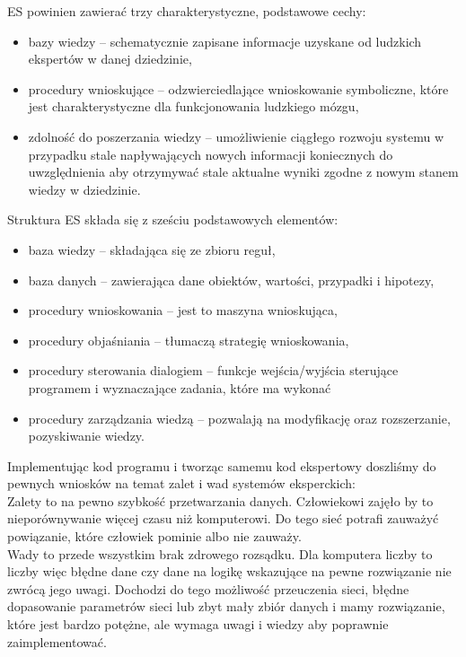 \documentclass[12pt,a4paper]{article}
\begin{document}
	ES powinien zawierać trzy charakterystyczne, podstawowe cechy:
	\begin{itemize}
		\item bazy wiedzy -- schematycznie zapisane informacje uzyskane od ludzkich ekspertów w danej dziedzinie,
		\item procedury wnioskujące -- odzwierciedlające wnioskowanie symboliczne, które jest charakterystyczne dla funkcjonowania ludzkiego mózgu,
		\item zdolność do poszerzania wiedzy -- umożliwienie ciągłego rozwoju systemu w przypadku stale napływających nowych informacji koniecznych do uwzględnienia aby otrzymywać stale aktualne wyniki zgodne z nowym stanem wiedzy w dziedzinie.
	\end{itemize}
	\bigskip
	
	Struktura ES składa się z sześciu podstawowych elementów:
	\begin{itemize}
		\item baza wiedzy -- składająca się ze zbioru reguł,
		\item baza danych -- zawierająca dane obiektów, wartości, przypadki i hipotezy,
		\item procedury wnioskowania -- jest to maszyna wnioskująca,
		\item procedury objaśniania -- tłumaczą strategię wnioskowania,
		\item procedury sterowania dialogiem -- funkcje wejścia/wyjścia sterujące programem i wyznaczające zadania, które ma wykonać
		\item procedury zarządzania wiedzą -- pozwalają na modyfikację oraz rozszerzanie, pozyskiwanie wiedzy.
	\end{itemize}
	
	
	
	
	Implementując kod programu i tworząc samemu kod ekspertowy doszliśmy do pewnych wniosków na temat zalet i wad systemów eksperckich:\\
	Zalety to na pewno szybkość przetwarzania danych. Człowiekowi zajęło by to nieporównywanie więcej czasu niż komputerowi. Do tego sieć potrafi zauważyć powiązanie, które człowiek pominie albo nie zauważy.\\
	Wady to przede wszystkim brak zdrowego rozsądku. Dla komputera liczby to liczby więc błędne dane czy dane na logikę wskazujące na pewne rozwiązanie nie zwrócą jego uwagi. Dochodzi do tego możliwość przeuczenia sieci, błędne dopasowanie parametrów sieci lub zbyt mały zbiór danych i mamy rozwiązanie, które jest bardzo potężne, ale wymaga uwagi i wiedzy aby poprawnie zaimplementować.
	
\end{document}
